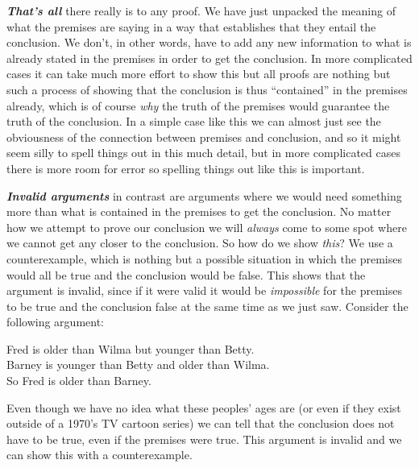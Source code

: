 \documentclass[
  12pt, openany]{book}
\theoremstyle{definition}
\theoremstyle{definition}
\theoremstyle{definition}
\theoremstyle{definition}
\theoremstyle{remark}
\begin{document}
\textbf{\emph{That's all}} there really is to any proof. We have just unpacked the meaning of what the premises are saying in a way that establishes that they entail the conclusion. We don't, in other words, have to add any new information to what is already stated in the premises in order to get the conclusion. In more complicated cases it can take much more effort to show this but all proofs are nothing but such a process of showing that the conclusion is thus ``contained'' in the premises already, which is of course \emph{why} the truth of the premises would guarantee the truth of the conclusion. In a simple case like this we can almost just see the obviousness of the connection between premises and conclusion, and so it might seem silly to spell things out in this much detail, but in more complicated cases there is more room for error so spelling things out like this is important.

\textbf{\emph{Invalid arguments}} in contrast are arguments where we would need something more than what is contained in the premises to get the conclusion. No matter how we attempt to prove our conclusion we will \emph{always} come to some spot where we cannot get any closer to the conclusion. So how do we show \emph{this}? We use a counterexample, which is nothing but a possible situation in which the premises would all be true and the conclusion would be false. This shows that the argument is invalid, since if it were valid it would be \emph{impossible} for the premises to be true and the conclusion false at the same time as we just saw. Consider the following argument:

\begin{center}

\begin{argument}
Fred is older than Wilma but younger than Betty.\\
Barney is younger than Betty and older than Wilma.\\

So Fred is older than Barney.

\end{argument}


\end{center}

Even though we have no idea what these peoples' ages are (or even if they exist outside of a 1970's TV cartoon series) we can tell that the conclusion does not have to be true, even if the premises were true. This argument is invalid and we can show this with a counterexample.
\end{document}
